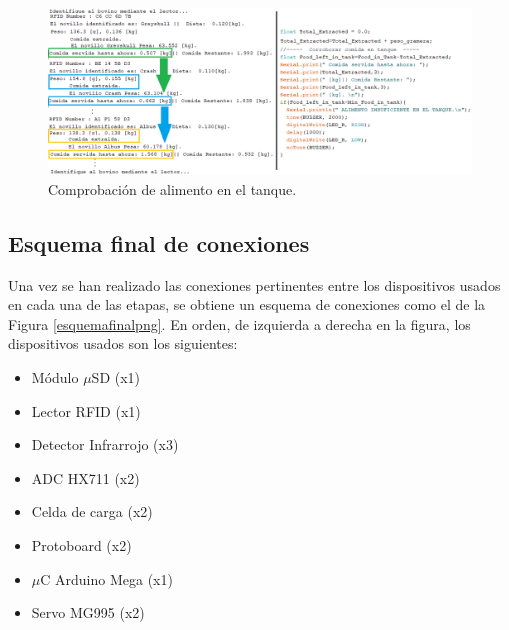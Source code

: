 \begin{figure}[H]
	\begin{center}
		\includegraphics[scale=0.53]{img/lvltanque.png}
	\end{center}
	\caption{Comprobación de alimento en el tanque.}\label{lvltanquepng}
\end{figure}

\subsection{Esquema final de conexiones}

Una vez se han realizado las conexiones pertinentes entre los dispositivos usados en cada una de las etapas, se obtiene un esquema de conexiones como el de la Figura \ref{esquemafinalpng}. En orden, de izquierda a derecha en la figura, los dispositivos usados son los siguientes:

\begin{multicols}{2}
    \begin{itemize}
        \item Módulo $\mu$SD (x1) \item Lector RFID (x1) 
        \item Detector Infrarrojo (x3) \item ADC HX711 (x2)
        \item Celda de carga (x2) \item Protoboard (x2)
        \item $\mu$C Arduino Mega (x1) \item Servo MG995 (x2)
    \end{itemize}
\end{multicols}
    
\pagebreak

